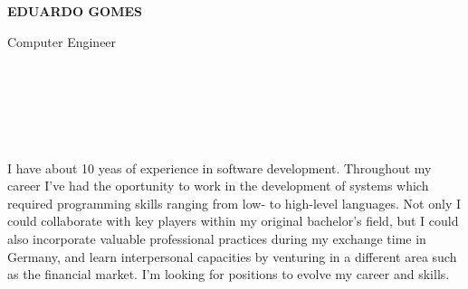 \documentclass[10pt]{developercv} %
\begin{document}
\begin{minipage}[t]{0.6\textwidth}
  \vspace{-\baselineskip} %

  {\HUGE\textbf{\MakeUppercase{Eduardo Gomes}}}
  \vspace{5pt}

  {\huge Computer Engineer} %

  \\

\end{minipage}
\begin{minipage}[t]{0.3\textwidth}
  \vspace{-\baselineskip} %

  \\
  \\
  \\
\end{minipage}



\begin{minipage}[t]{\textwidth}

  I have about 10 yeas of experience in software development. Throughout my career I’ve had the oportunity to work in the development of systems which required programming skills ranging from low- to high-level languages. Not only I could collaborate with key players within my original bachelor’s field, but I could also incorporate valuable professional practices during my exchange time in Germany, and learn interpersonal capacities by venturing in a different area such as the financial market. I’m looking for positions to evolve my career and skills.
\end{minipage}


\begin{minipage}[t]{\textwidth}

  \begin{skills}
  \end{skills}
\end{minipage}
\end{document}
